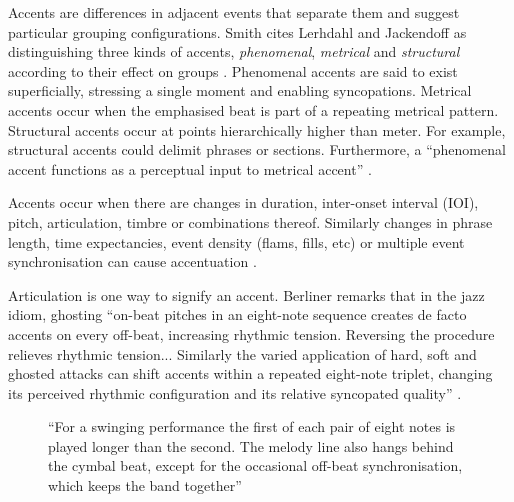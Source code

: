 Accents are differences in adjacent events that separate them and suggest 
particular grouping configurations. Smith cites Lerhdahl and
Jackendoff as distinguishing three kinds of accents, {\it phenomenal},
{\it metrical} and {\it structural} according to their effect on 
groups \cite[p. 19]{Smith:99}. Phenomenal accents are said
to exist superficially, stressing a single moment and enabling
syncopations. Metrical accents occur when the emphasised beat is
part of a repeating metrical pattern. Structural accents occur at
points hierarchically higher than meter. For example, structural accents 
could delimit phrases or sections.  Furthermore, a ``phenomenal accent
functions as a perceptual input to metrical accent'' \cite{Lerdahl:83}.

Accents occur when there are changes in duration, inter-onset 
interval (IOI), pitch, articulation, timbre or combinations thereof. 
Similarly changes in phrase length, time expectancies, event density 
(flams, fills, etc) or multiple event synchronisation can cause
accentuation \cite[p. 19]{Smith:99} \cite[p. 426]{Parncutt:94}. 

Articulation is one way to signify an accent. Berliner remarks that in
the jazz idiom, ghosting ``on-beat pitches in an eight-note sequence
creates de facto accents on every off-beat, increasing rhythmic
tension. Reversing the procedure relieves rhythmic
tension... Similarly the varied application of hard, soft and ghosted
attacks can shift accents within a repeated eight-note triplet, changing
its perceived rhythmic configuration and its relative syncopated
quality'' \cite[p. 156]{Berliner:94}.


\begin{figure}[thp]
  \begin{center}
    \caption{``For a swinging performance the first of each pair of
      eight notes is played longer than the second. The melody line
      also hangs behind the cymbal beat, except for the occasional
      off-beat synchronisation, which keeps the band together'' \cite{Hamer:2000}}
    \label{allthatJazz}
  \end{center}
\end{figure}

